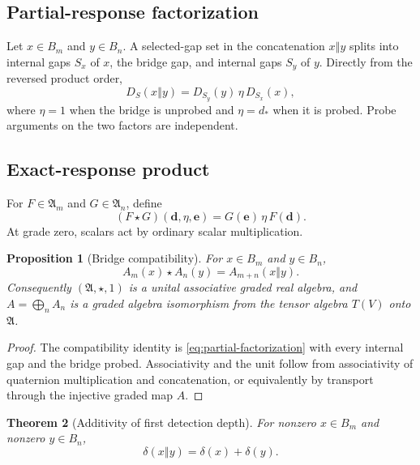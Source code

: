 \documentclass[11pt]{article}
\newtheorem{theorem}{Theorem}[section]
\newtheorem{proposition}[theorem]{Proposition}
\theoremstyle{definition}
\theoremstyle{remark}
\newcommand{\Aresp}{\mathfrak A}
\newcommand{\depth}{\delta}
\newcommand{\concat}{\mathbin{\Vert}}
\newcommand{\bridge}{\star}
\begin{document}
\subsection{Partial-response factorization}

Let $x\in B_m$ and $y\in B_n$.  A selected-gap set in the concatenation $x\concat y$ splits into internal gaps $S_x$ of $x$, the bridge gap, and internal gaps $S_y$ of $y$.  Directly from the reversed product order,
\begin{equation}\label{eq:partial-factorization}
  D_S(x\concat y)
  =D_{S_y}(y)\,\eta\,D_{S_x}(x),
\end{equation}
where $\eta=1$ when the bridge is unprobed and $\eta=d_*$ when it is probed.  Probe arguments on the two factors are independent.

\subsection{Exact-response product}

For $F\in\Aresp_m$ and $G\in\Aresp_n$, define
\begin{equation}\label{eq:bridge-product}
  (F\bridge G)(\mathbf d,\eta,\mathbf e)
  =G(\mathbf e)\,\eta\,F(\mathbf d).
\end{equation}
At grade zero, scalars act by ordinary scalar multiplication.

\begin{proposition}[Bridge compatibility]\label{prop:bridge}
For $x\in B_m$ and $y\in B_n$,
\[
  A_m(x)\bridge A_n(y)=A_{m+n}(x\concat y).
\]
Consequently $(\Aresp,\bridge,1)$ is a unital associative graded real algebra, and $A=\bigoplus_n A_n$ is a graded algebra isomorphism from the tensor algebra $T(V)$ onto $\Aresp$.
\end{proposition}

\begin{proof}
The compatibility identity is \eqref{eq:partial-factorization} with every internal gap and the bridge probed.  Associativity and the unit follow from associativity of quaternion multiplication and concatenation, or equivalently by transport through the injective graded map $A$.
\end{proof}

\begin{theorem}[Additivity of first detection depth]\label{thm:additive-depth}
For nonzero $x\in B_m$ and nonzero $y\in B_n$,
\begin{equation}\label{eq:additive-depth}
  \depth(x\concat y)=\depth(x)+\depth(y).
\end{equation}
\end{theorem}
\end{document}
